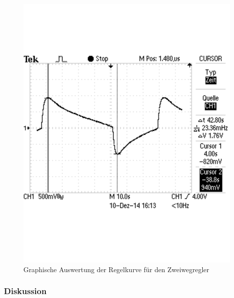 \documentclass[12pt,a4paper]{article}
\begin{document}
\begin{figure}[H] 
  \centering
    \includegraphics[trim = 0mm 50mm 0mm 50mm, clip, scale = 0.6]{2_2.pdf}
  	\caption[Graphische Auswertung der Regelkurve für den Zweiwegregler]{Graphische Auswertung der Regelkurve für den Zweiwegregler}
  \label{fig:2_2}
\end{figure}

\subsubsection*{Diskussion}
\end{document}

